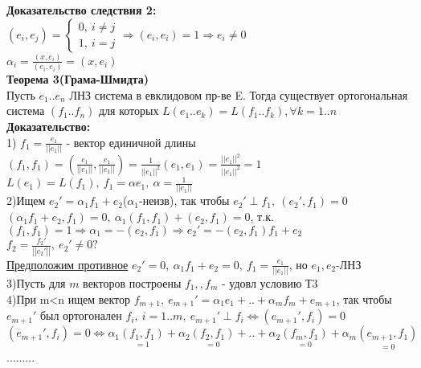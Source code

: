 \textbf{Доказательство следствия 2:} \\
$(e_i,e_j)=\left\{ \begin{matrix}
\mbox{$0, \ i \ne j $} \\
\mbox{$1, \ i=j$}
\end{matrix}\right. \Rightarrow (e_i,e_i)=1 \Rightarrow e_i \ne 0 $ \\
$\alpha_i = \frac{(x,e_i)}{(e_i,e_i)}=(x,e_i)$ \\
\textbf{Теорема 3(Грама-Шмидта)} \\
Пусть $e_1..e_n$ ЛНЗ система в евклидовом пр-ве E. Тогда существует ортогональная система $(f_1..f_n)$ для которых 
$L(e_1..e_k)=L(f_1..f_k), \forall k =1..n$ \\
\textbf{Доказательство:} \\
1) $f_1=\frac{e_1}{\left| \left| e_1 \right| \right|}$ - вектор единичной длины \\
$(f_1,f_1)=\left(\frac{e_1}{\left| \left| e_1 \right| \right|},\frac{e_1}{\left| \left| e_1 \right| \right|} \right) = \frac{1}{\left| \left| e_1 \right| \right|^2}(e_1,e_1)=
\frac{\left| \left| e_1 \right| \right|^2}{\left| \left| e_1 \right| \right|^2} = 1$ \\
$L(e_1)=L(f_1), \ f_1=\alpha e_1 , \ \alpha = \frac{1}{\left| \left| e_1 \right| \right|}$ \\
2)Ищем $e_2'=\alpha_1 f_1 + e_2$($\alpha_1$-неизв), так чтобы $e_2' \perp f_1, \ (e_2',f_1)=0$ \\
$(\alpha_1 f_1 + e_2,f_1)=0, \ \alpha_1(f_1,f_1)+(e_2,f_1)=0$, т.к. $(f_1,f_1)=1 \Rightarrow \alpha_1=-(e_2,f_1) \Rightarrow e_2'=-(e_2,f_1)f_1+e_2$ \\
$f_2=\frac{f_2'}{\left| \left| e_2' \right| \right|}, \ e_2' \ne 0 ?$ \\
\underline{Предположим противное} $e_2'=0, \ \alpha_1 f_1 + e_2 = 0 , \ f_1=\frac{e_1}{\left| \left| e_1 \right| \right|}$, но $e_1,e_2$-ЛНЗ \\
3)Пусть для $m$ векторов построены $f_1,,f_m$ - удовл условию Т3 \\
4)При m<n ищем вектор $f_{m+1}, \ e_{m+1}' = \alpha_1 e_1 + .. + \alpha_m f_m + e_{m+1}$, так чтобы $e_{m+1}'$ был ортогонален $f_i, \ i=1..m, \ 
e_{m+1}' \perp f_i \Leftrightarrow (e_{m+1}',f_i)=0$ \\
$(e_{m+1}',f_i)=0 \Leftrightarrow \alpha_1 \underset {=1} {(f_1,f_1)} + \alpha_2 \underset {=0} {(f_2,f_1)} + .. + \alpha_2 \underset {=0} {(f_m,f_1)} + \alpha_m \underset {=0} {(e_{m+1},f_1)}$ \\
.........\\
